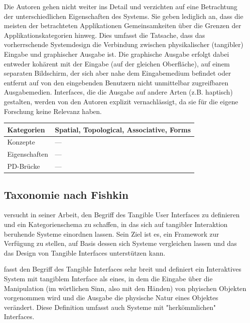 Die Autoren gehen nicht weiter ins Detail und verzichten auf eine Betrachtung der unterschiedlichen Eigenschaften des Systems. Sie geben lediglich an, dass die meisten der betrachteten Applikationen Gemeinsamkeiten über die Grenzen der Applikationskategorien hinweg. Dies umfasst die Tatsache, dass das vorherrschende Systemdesign die Verbindung zwischen physikalischer (tangibler) Eingabe und graphischer Ausgabe ist. Die graphische Ausgabe erfolgt dabei entweder kohärent mit der Eingabe (auf der gleichen Oberfläche), auf einem separaten Bildschirm, der sich aber nahe dem Eingabemedium befindet oder entfernt auf von den eingebenden Benutzern nicht unmittelbar zugreifbaren Ausgabemedien. Interfaces, die die Ausgabe auf andere Arten (z.B. haptisch) gestalten, werden von den Autoren explizit vernachlässigt, da sie für die eigene Forschung keine Relevanz haben.

\begin{tabular}{| p{3cm} | p{10cm} |}
  \hline
  Kategorien & Spatial, Topological, Associative, Forms \\ \hline
  Konzepte & --- \\ \hline
  Eigenschaften & --- \\ \hline
  PD-Brücke & --- \\ \hline
\end{tabular} 


\subsection{Taxonomie nach Fishkin} %
\label{sub:taxonomie_fishkin}

\citet{Fishkin04} versucht in seiner Arbeit, den Begriff des Tangible User Interfaces zu definieren und ein Kategorienschema zu schaffen, in das sich auf tangibler Interaktion beruhende Systeme einordnen lassen. Sein Ziel ist es, ein Framework zur Verfügung zu stellen, auf Basis dessen sich Systeme vergleichen lassen und das das Design von Tangible Interfaces unterstützen kann.

\citeauthor{Fishkin04} fasst den Begriff des Tangible Interfaces sehr breit und definiert ein Interaktives System mit tangiblem Interface als eines, in dem die Eingabe über die Manipulation (im wörtlichen Sinn, also mit den Händen) von phyischen Objekten vorgenommen wird und die Ausgabe die physische Natur eines Objektes verändert. Diese Definition umfasst auch Systeme mit "herkömmlichen" Interfaces.

